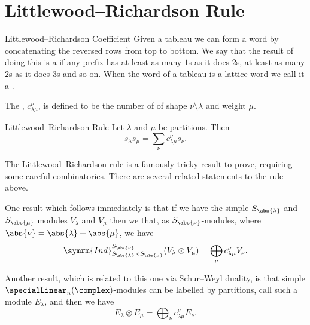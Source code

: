 \documentclass[fleqn]{NotesClass}
\newcommand{\Ind}{\symrm{Ind}}
\begin{document}
    \section{Littlewood--Richardson Rule}
    \begin{dfn}{Littlewood--Richardson Coefficient}{}
        Given a tableau we can form a word by concatenating the reversed rows from top to bottom.
        We say that the result of doing this is a  if any prefix has at least as many \(1\)s as it does \(2\)s, at least as many \(2\)s as it does \(3\)s and so on.
        When the word of a tableau is a lattice word we call it a .
        
        The , \(c_{\lambda\mu}^\nu\), is defined to be the number of of shape \(\nu \setminus \lambda\) and weight \(\mu\).
    \end{dfn}
    
    \begin{thm}{Littlewood--Richardson Rule}{}
        Let \(\lambda\) and \(\mu\) be partitions.
        Then
        \begin{equation}
            s_\lambda s_\mu = \sum_{\nu} c^\nu_{\lambda\mu} s_\nu.
        \end{equation}
    \end{thm}
    
    The Littlewood--Richardson rule is a famously tricky result to prove, requiring some careful combinatorics.
    There are several related statements to the rule above.
    
    One result which follows immediately is that if we have the simple \(S_{\abs{\lambda}}\) and \(S_{\abs{\mu}}\) modules \(V_\lambda\) and \(V_\mu\) then we that, as \(S_{\abs{\nu}}\)-modules, where \(\abs{\nu} = \abs{\lambda} + \abs{\mu}\), we have
    \begin{equation}
        \Ind^{S_{\abs{\nu}}}_{S_{\abs{\lambda}} \times S_{\abs{\mu}}} (V_\lambda \otimes V_\mu) = \bigoplus_{\nu} c^\nu_{\lambda\mu} V_\nu.
    \end{equation}
    
    Another result, which is related to this one via Schur--Weyl duality, is that simple \(\specialLinear_n(\complex)\)-modules can be labelled by partitions, call such a module \(E_\lambda\), and then we have
    \begin{equation}
        E_\lambda \otimes E_\mu = \bigoplus_{\nu} c^\nu_{\lambda\mu}E_\nu.
    \end{equation}
    
\end{document}
